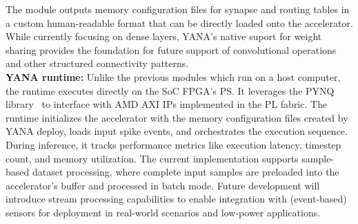 The module outputs memory configuration files for synapse and routing tables in a custom human-readable format that can be directly loaded onto the accelerator. While currently focusing on dense layers, YANA's native suport for weight sharing provides the foundation for future support of convolutional operations and other structured connectivity patterns.
\\
\textbf{YANA runtime:}
Unlike the previous modules which run on a host computer, the runtime executes directly on the \ac{SoC} FPGA's \ac{PS}. It leverages the PYNQ library~\cite{advanced_micro_devices_inc_pynq_2024} to interface with AMD AXI IPs implemented in the \ac{PL} fabric. The runtime initializes the accelerator with the memory configuration files created by YANA deploy, loads input spike events, and orchestrates the execution sequence. During inference, it tracks performance metrics like execution latency, timestep count, and memory utilization.
The current implementation supports sample-based dataset processing, where complete input samples are preloaded into the accelerator's buffer and processed in batch mode. Future development will introduce stream processing capabilities to enable integration with (event-based) sensors for deployment in real-world scenarios and low-power applications.
